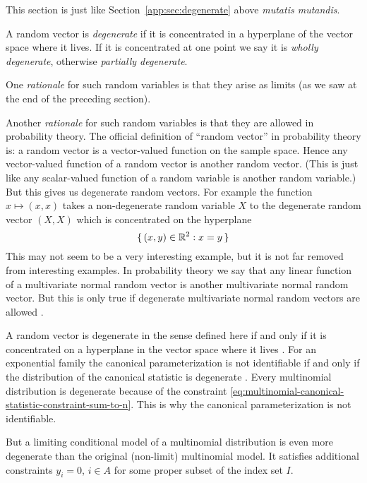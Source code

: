 This section is just like Section~\ref{app:sec:degenerate} above
\emph{mutatis mutandis}.

A random vector is \emph{degenerate} if it is concentrated in a hyperplane
of the vector space where it lives.  If it is concentrated at one point
we say it is \emph{wholly degenerate}, otherwise \emph{partially degenerate}.

One \emph{rationale} for such random variables is that they arise as limits
(as we saw at the end of the preceding section).

Another \emph{rationale} for such random variables is that they are allowed
in probability theory.  The official definition of ``random vector'' in
probability theory is: a random vector is a vector-valued function
on the sample space.  Hence any vector-valued function of a random vector
is another random vector.  (This is just like any scalar-valued function
of a random variable is another random variable.)
But this gives us degenerate random vectors.
For example the function $x \mapsto (x, x)$ takes a non-degenerate random
variable $X$ to the degenerate random vector $(X, X)$ which is concentrated
on the hyperplane
$$
   \{\,  (x, y) \in \mathbb{R}^2 : x = y  \,\}
$$
This may not seem to be a very interesting example, but it is not far removed
from interesting examples.  In probability theory we say that any linear
function of a multivariate normal random vector is another multivariate
normal random vector.  But this is only true if degenerate multivariate
normal random vectors are allowed \citep[Slides~118 ff.]{geyer-5101-deck5}.

A random vector is degenerate in the sense defined here if and only if
it is concentrated on a hyperplane in the vector space where it lives
\citep[Slide~119 ff.]{geyer-5101-deck5}.  For an exponential family
the canonical parameterization is not identifiable if and only if the
distribution of the canonical statistic is degenerate
\citep[Theorem~1]{geyer-gdor}.  Every multinomial distribution is degenerate
because of the constraint
\eqref{eq:multinomial-canonical-statistic-constraint-sum-to-n}.
This is why the canonical parameterization is not identifiable.

But a limiting conditional model of a multinomial distribution is even
more degenerate than the original (non-limit) multinomial model.
It satisfies additional constraints $y_i = 0$, $i \in A$ for some proper
subset of the index set $I$.

